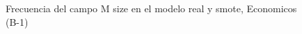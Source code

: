 \begin{figure}[H]
    \centering
    
    \caption{Frecuencia del campo M size en el modelo real y smote, Economicos (B-1)}
    \label{frecuency-M Size-smote-enc}
\end{figure}